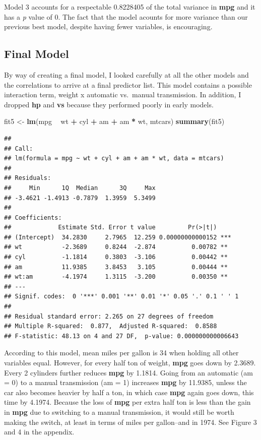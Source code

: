 \documentclass[]{article}
\newenvironment{Shaded}{\begin{snugshade}}{\end{snugshade}}
\newcommand{\KeywordTok}[1]{\textcolor[rgb]{0.13,0.29,0.53}{\textbf{#1}}}
\newcommand{\StringTok}[1]{\textcolor[rgb]{0.31,0.60,0.02}{#1}}
\newcommand{\OperatorTok}[1]{\textcolor[rgb]{0.81,0.36,0.00}{\textbf{#1}}}
\newcommand{\NormalTok}[1]{#1}
\begin{document}
Model 3 accounts for a respectable 0.8228405 of the total variance in
\textbf{mpg} and it has a \emph{p} value of 0. The fact that the model
acounts for more variance than our previous best model, despite having
fewer variables, is encouraging.

\subsection{Final Model}\label{final-model}

By way of creating a final model, I looked carefully at all the other
models and the correlations to arrive at a final predictor list. This
model contains a possible interaction term, weight x automatic
vs.~manual transmission. In addition, I dropped \textbf{hp} and
\textbf{vs} because they performed poorly in early models.

\begin{Shaded}
\begin{Highlighting}[]
\NormalTok{fit5 <-}\StringTok{ }\KeywordTok{lm}\NormalTok{(mpg }\OperatorTok{~}\StringTok{ }\NormalTok{wt }\OperatorTok{+}\StringTok{ }\NormalTok{cyl }\OperatorTok{+}\StringTok{ }\NormalTok{am }\OperatorTok{+}\StringTok{ }\NormalTok{am }\OperatorTok{*}\StringTok{ }\NormalTok{wt, mtcars)}
\KeywordTok{summary}\NormalTok{(fit5)}
\end{Highlighting}
\end{Shaded}

\begin{verbatim}
## 
## Call:
## lm(formula = mpg ~ wt + cyl + am + am * wt, data = mtcars)
## 
## Residuals:
##     Min      1Q  Median      3Q     Max 
## -3.4621 -1.4913 -0.7879  1.3959  5.3499 
## 
## Coefficients:
##             Estimate Std. Error t value         Pr(>|t|)    
## (Intercept)  34.2830     2.7965  12.259 0.00000000000152 ***
## wt           -2.3689     0.8244  -2.874          0.00782 ** 
## cyl          -1.1814     0.3803  -3.106          0.00442 ** 
## am           11.9385     3.8453   3.105          0.00444 ** 
## wt:am        -4.1974     1.3115  -3.200          0.00350 ** 
## ---
## Signif. codes:  0 '***' 0.001 '**' 0.01 '*' 0.05 '.' 0.1 ' ' 1
## 
## Residual standard error: 2.265 on 27 degrees of freedom
## Multiple R-squared:  0.877,  Adjusted R-squared:  0.8588 
## F-statistic: 48.13 on 4 and 27 DF,  p-value: 0.000000000006643
\end{verbatim}

According to this model, mean miles per gallon is 34 when holding all
other variables equal. However, for every half ton of weight,
\textbf{mpg} goes down by 2.3689. Every 2 cylinders further reduces
\textbf{mpg} by 1.1814. Going from an automatic (am = 0) to a manual
transmission (am = 1) increases \textbf{mpg} by 11.9385, unless the car
also becomes heavier by half a ton, in which case \textbf{mpg} again
goes down, this time by 4.1974. Because the loss of \textbf{mpg} per
extra half ton is less than the gain in \textbf{mpg} due to switching to
a manual transmission, it would still be worth making the switch, at
least in terms of miles per gallon--and in 1974. See Figure 3 and 4 in
the appendix.
\end{document}
